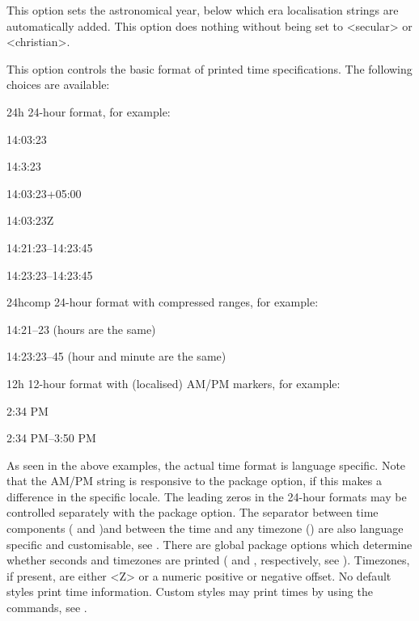 \documentclass{ltxdockit}[2011/03/25]
\begin{document}
\begin{optionlist}

This option sets the astronomical year, below which era localisation strings are automatically added. This option does nothing without  being set to <secular> or <christian>.


This option controls the basic format of printed time specifications. The following choices are available:

\begin{valuelist}
\item[24h] 24-hour format, for example:\par
14:03:23\par
14:3:23\par
14:03:23+05:00\par
14:03:23Z\par
14:21:23--14:23:45\par
14:23:23--14:23:45\par
\item[24hcomp] 24-hour format with compressed ranges, for example:\par
14:21--23 (hours are the same)\par
14:23:23--45 (hour and minute are the same)\par
\item[12h] 12-hour format with (localised) AM/PM markers, for example:\par
2:34 PM\par
2:34 PM--3:50 PM\par
\end{valuelist}
%
As seen in the above examples, the actual time format is language specific. Note that the AM/PM string is responsive to the  package option, if this makes a difference in the specific locale. The leading zeros in the 24-hour formats may be controlled separately with the  package option. The separator between time components ( and )and between the time and any timezone () are also language specific and customisable, see . There are global package options which determine whether seconds and timezones are printed ( and , respectively, see ). Timezones, if present, are either <Z> or a numeric positive or negative offset. No default styles print time information. Custom styles may print times by using the  commands, see .


\end{optionlist}
\end{document}
